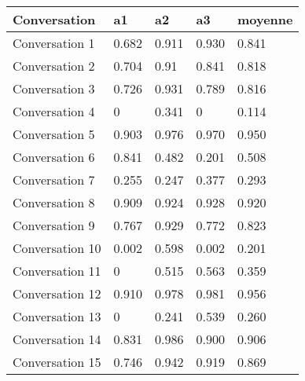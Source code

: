 \begin{table}
  \centering
\begin{tabular}{|l|l|l|l|l|}
\hline
Conversation     &a1        &a2     &a3           & moyenne \\ \hline
Conversation 1   & 0.682    & 0.911 & 0.930       & 0.841   \\ \hline
Conversation 2   & 0.704    & 0.91  & 0.841       & 0.818   \\ \hline
Conversation 3   & 0.726    & 0.931 & 0.789       & 0.816   \\ \hline
Conversation 4   & 0        & 0.341 & 0           & 0.114   \\ \hline
Conversation 5   & 0.903    & 0.976 & 0.970       & 0.950   \\ \hline
Conversation 6   & 0.841    & 0.482 & 0.201       & 0.508   \\ \hline
Conversation 7   & 0.255    & 0.247 & 0.377       & 0.293   \\ \hline
Conversation 8   & 0.909    & 0.924 & 0.928       & 0.920   \\ \hline
Conversation 9   & 0.767    & 0.929 & 0.772       & 0.823   \\ \hline
Conversation 10  & 0.002    & 0.598 & 0.002       & 0.201   \\ \hline
Conversation 11  & 0        & 0.515 & 0.563       & 0.359   \\ \hline
Conversation 12  & 0.910    & 0.978 & 0.981       & 0.956   \\ \hline
Conversation 13  & 0        & 0.241 & 0.539       & 0.260   \\ \hline
Conversation 14  & 0.831    & 0.986 & 0.900       & 0.906   \\ \hline
Conversation 15  & 0.746    & 0.942 & 0.919       & 0.869   \\ \hline

\end{tabular}
\end{table}
